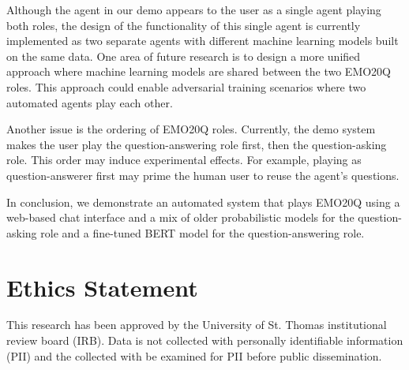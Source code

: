 \documentclass[conference]{IEEEtran}
\begin{document}
Although the agent in our demo appears to the user as a single agent
playing both roles, the design of the functionality of this single
agent is currently implemented as two separate agents with different
machine learning models built on the same data. One area of future
research is to design a more unified approach where machine learning
models are shared between the two EMO20Q roles.  This approach could
enable adversarial training scenarios where two automated agents play
each other.




Another issue is the ordering of EMO20Q roles.  Currently, the demo
system makes the user play the question-answering role first, then the
question-asking role. This order may induce experimental effects.  For
example, playing as question-answerer first may prime the human user
to reuse the agent's questions.


In conclusion, we demonstrate an automated system that plays EMO20Q
using a web-based chat interface and a mix of older probabilistic
models for the question-asking role and a fine-tuned BERT model for
the question-answering role.




\section{Ethics Statement}

This research has been approved by the
University of St. Thomas
institutional review board (IRB).  Data is not collected with
personally identifiable information (PII) and the collected with be
examined for PII before public dissemination.




%

\end{document}
